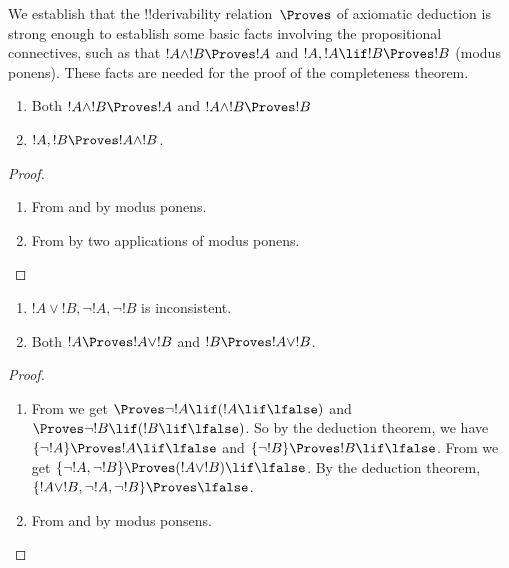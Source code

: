 

\begin{explain}
  We establish that the !!{derivability} relation~$\Proves$ of
  axiomatic deduction is strong enough to establish some basic facts
  involving the propositional connectives, such as that $!A \land !B
  \Proves !A$ and $!A, !A \lif !B \Proves !B$ (modus ponens). These
  facts are needed for the proof of the completeness theorem.
\end{explain}

\begin{prop}
  \begin{enumerate}
  \item {} Both $!A \land !B \Proves
    !A$ and $!A \land !B \Proves !B$
  \item {} $!A, !B \Proves !A \land !B$.
  \end{enumerate}
\end{prop}

\begin{proof}
  \begin{enumerate}
    \item From  and  by
      modus ponens.
  \item From  by two applications of
    modus ponens.
  \end{enumerate}
\end{proof}


\begin{prop}
  \begin{enumerate}
  \item $!A \lor !B, \lnot !A, \lnot !B$ is inconsistent.
  \item Both $!A \Proves !A \lor !B$ and $!B \Proves !A \lor !B$.
  \end{enumerate}
\end{prop}

\begin{proof}
  \begin{enumerate}
  \item From  we get $\Proves \lnot !A \lif (!A
    \lif \lfalse)$ and $\Proves \lnot !B \lif (!B \lif \lfalse)$. So
    by the deduction theorem, we have $\{\lnot !A\} \Proves !A \lif
    \lfalse$ and $\{\lnot !B\} \Proves !B \lif \lfalse$. From
     we get $\{\lnot !A, \lnot !B\} \Proves (!A
    \lor !B) \lif \lfalse$. By the deduction theorem, $\{!A \lor !B,
    \lnot !A, \lnot !B\} \Proves \lfalse$.
  \item From  and  by modus
    ponsens.
  \end{enumerate}
\end{proof}

